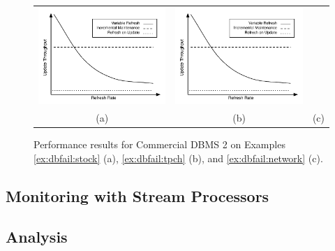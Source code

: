 \begin{figure}
\begin{center}
\begin{tabular}{ccc}
\includegraphics[width=2in]{../graphics-tmp/placeholder_db_result} &
\includegraphics[width=2in]{../graphics-tmp/placeholder_db_result} \\
(a) & (b) & (c)
\end{tabular}
\end{center}
\label{fig:dbfail:CD2}
\caption{Performance results for Commercial DBMS 2 on Examples \ref{ex:dbfail:stock} (a), \ref{ex:dbfail:tpch} (b), and \ref{ex:dbfail:network} (c).}
\end{figure}



\subsection{Monitoring with Stream Processors}

\subsection{Analysis}